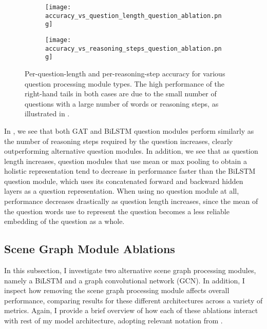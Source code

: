 \begin{figure}[htbp]
    \centering
    \begin{subfigure}[l]{0.5\textwidth}
        \texttt{[image: accuracy\_vs\_question\_length\_question\_ablation.png]}
        \label{fig:accuracy_vs_question_length_question_ablation}
    \end{subfigure}
    \begin{subfigure}[r]{0.49\textwidth}
        \texttt{[image: accuracy\_vs\_reasoning\_steps\_question\_ablation.png]}
        \label{fig:accuracy_vs_reasoning_steps_question_ablation}
    \end{subfigure}
    \caption[Per-question-length and per-reasoning-step accuracy for various question processing module types.]{Per-question-length and per-reasoning-step accuracy for various question processing module types. The high performance of the right-hand tails in both cases are due to the small number of questions with a large number of words or reasoning steps, as illustrated in \figureautorefname{ \ref{fig:test_reasoning_step_and_question_length_distribution}}.}
    \label{fig:accuracy_vs_question_length_and_reasoning_steps_question_ablation}
\end{figure}

In \figureautorefname{ \ref{fig:accuracy_vs_question_length_and_reasoning_steps_question_ablation}}, we see that both GAT and BiLSTM question modules perform similarly as the number of reasoning steps required by the question increases, clearly outperforming alternative question modules. In addition, we see that as question length increases, question modules that use mean or max pooling to obtain a holistic representation tend to decrease in performance faster than the BiLSTM question module, which uses its concatenated forward and backward hidden layers as a question representation. When using no question module at all, performance decreases drastically as question length increases, since the mean of the question words use to represent the question becomes a less reliable embedding of the question as a whole.

\subsection{Scene Graph Module Ablations}
\label{subsec:scene_graph_module_ablations}

In this subsection, I investigate two alternative scene graph processing modules, namely a BiLSTM and a graph convolutional network (GCN). In addition, I inspect how removing the scene graph processing module affects overall performance, comparing results for these different architectures across a variety of metrics. Again, I provide a brief overview of how each of these ablations interact with rest of my model architecture, adopting relevant notation from \chapterautorefname{ \ref{chapter:methodology}}.

